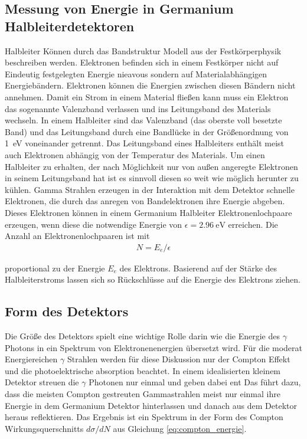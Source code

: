 \subsection{Messung von Energie in Germanium Halbleiterdetektoren \cite{book:gil}}

Halbleiter Können durch das Bandstruktur Modell aus der Festkörperphysik
beschreiben werden. Elektronen befinden sich in einem Festkörper nicht auf
Eindeutig festgelegten Energie nieavous sondern auf Materialabhängigen
Energiebändern. Elektronen können die Energien zwischen diesen Bändern nicht
annehmen. Damit ein Strom in einem Material fließen kann muss ein Elektron das
sogenannte Valenzband verlassen und ins Leitungsband des Materials wechseln. In
einem Halbleiter sind das Valenzband (das oberste voll besetzte Band) und das
Leitungsband durch eine Bandlücke in der Größenordnung von \qty{1}{\eV}
voneinander getrennt.
Das Leitungsband eines Halbleiters enthält meist auch Elektronen abhängig von
der Temperatur des Materials.
Um einen Halbleiter zu erhalten, der nach Möglichkeit nur von außen angeregte
Elektronen in seinem Leitungsband hat ist es sinnvoll diesen so weit wie
möglich herunter zu kühlen. Gamma Strahlen erzeugen in der Interaktion mit dem
Detektor schnelle Elektronen, die durch das anregen von Bandelektronen ihre
Energie abgeben. Dieses Elektronen können in einem Germanium Halbleiter
Elektronenlochpaare erzeugen, wenn diese die notwendige Energie von $\epsilon =
	\qty{2.96}{\eV}$ erreichen. Die Anzahl an Elektronenlochpaaren ist mit
\begin{align}
	N = E_e / \epsilon
\end{align}

proportional zu der Energie $E_e$ des Elektrons. Basierend auf der Stärke des
Halbleiterstroms lassen sich so Rückschlüsse auf die Energie des Elektrons
ziehen.


\subsection{Form des Detektors \cite[vgl][Kap. 2.4]{book:gil}}

Die Größe des Detektors spielt eine wichtige Rolle darin wie die Energie des
$\gamma$ Photons in ein Spektrum von Elektronenenergien übersetzt wird. Für die
moderat Energiereichen $\gamma$ Strahlen werden für diese Diskussion nur der
Compton Effekt und die photoelektrische absorption beachtet. In einem
idealisierten kleinem Detektor streuen die $\gamma$ Photonen nur einmal und
geben dabei ent Das führt dazu, dass die meisten Compton gestreuten
Gammastrahlen meist nur einmal ihre Energie in dem Germanium Detektor
hinterlassen und danach aus dem Detektor heraus reflektieren. Das Ergebnis ist
ein Spektrum in der Form des Compton Wirkungsquerschnitts $d\sigma/dN$ aus Gleichung \eqref{eq:compton_energie}. 

